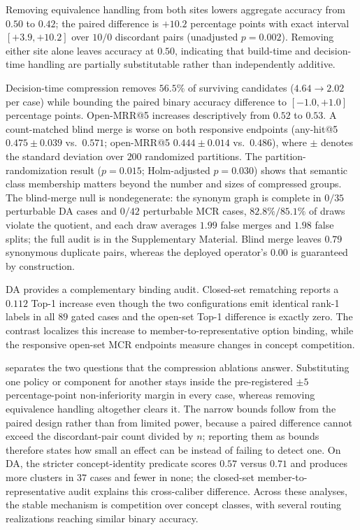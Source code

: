 \documentclass[letterpaper]{article} %
\begin{document}
Removing equivalence handling from both sites lowers aggregate accuracy from $0.50$ to $0.42$; the paired difference is $+10.2$ percentage points with exact interval $[+3.9,+10.2]$ over $10/0$ discordant pairs (unadjusted $p=0.002$).
Removing either site alone leaves accuracy at $0.50$, indicating that build-time and decision-time handling are partially substitutable rather than independently additive.

Decision-time compression removes $56.5\%$ of surviving candidates ($4.64 \rightarrow 2.02$ per case) while bounding the paired binary accuracy difference to $[-1.0,+1.0]$ percentage points.
Open-MRR@5 increases descriptively from $0.52$ to $0.53$.
A count-matched blind merge is worse on both responsive endpoints (any-hit@5 $0.475\pm0.039$ vs.\ $0.571$; open-MRR@5 $0.444\pm0.014$ vs.\ $0.486$), where $\pm$ denotes the standard deviation over $200$ randomized partitions.
The partition-randomization result ($p=0.015$; Holm-adjusted $p=0.030$) shows that semantic class membership matters beyond the number and sizes of compressed groups.
The blind-merge null is nondegenerate: the synonym graph is complete in $0/35$ perturbable DA cases and $0/42$ perturbable MCR cases, $82.8\%/85.1\%$ of draws violate the quotient, and each draw averages $1.99$ false merges and $1.98$ false splits; the full audit is in the Supplementary Material.
Blind merge leaves $0.79$ synonymous duplicate pairs, whereas the deployed operator's $0.00$ is guaranteed by construction.

DA provides a complementary binding audit.
Closed-set rematching reports a $0.112$ Top-1 increase even though the two configurations emit identical rank-1 labels in all $89$ gated cases and the open-set Top-1 difference is exactly zero.
The contrast localizes this increase to member-to-representative option binding, while the responsive open-set MCR endpoints measure changes in concept competition.

 separates the two questions that the compression ablations answer.
Substituting one policy or component for another stays inside the pre-registered $\pm5$ percentage-point non-inferiority margin in every case, whereas removing equivalence handling altogether clears it.
The narrow bounds follow from the paired design rather than from limited power, because a paired difference cannot exceed the discordant-pair count divided by $n$; reporting them as bounds therefore states how small an effect can be instead of failing to detect one.
On DA, the stricter concept-identity predicate scores $0.57$ versus $0.71$ and produces more clusters in $37$ cases and fewer in none; the closed-set member-to-representative audit explains this cross-caliber difference.
Across these analyses, the stable mechanism is competition over concept classes, with several routing realizations reaching similar binary accuracy.
\end{document}
